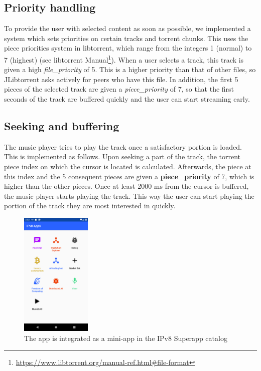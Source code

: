 \subsection{Priority handling}
To provide the user with selected content as soon as possible, we implemented a system which sets priorities on certain tracks and torrent chunks. This uses the piece priorities system in libtorrent, which range from the integers 1 (normal) to 7 (highest) (see libtorrent Manual\footnote{\url{https://www.libtorrent.org/manual-ref.html\#file-format}}). When a user selects a track, this track is given a high \textit{file\_priority} of 5. This is a higher priority than that of other files, so JLibtorrent asks actively for peers who have this file. In addition, the first 5  pieces of the selected track are given a \textit{piece\_priority} of 7, so that the first seconds of the track are buffered quickly and the user can start streaming early.
\subsection{Seeking and buffering}
The music player tries to play the track once a satisfactory portion is loaded. This is implemented as follows. Upon seeking a part of the track, the torrent piece index on which the cursor is located is calculated. Afterwards, the piece at this index and the 5 consequent pieces are given a \textbf{piece\_priority} of 7, which is higher than the other pieces. Once at least 2000 ms from the cursor is buffered, the music player starts playing the track. This way the user can start playing the portion of the track they are most interested in quickly.
\begin{figure}
    \includegraphics[width=0.3\textwidth]{implementation/screenshot-superapp.png}
    \caption{The app is integrated as a mini-app in the IPv8 Superapp catalog}
    \label{fig:screenshot-superapp}
\end{figure}
